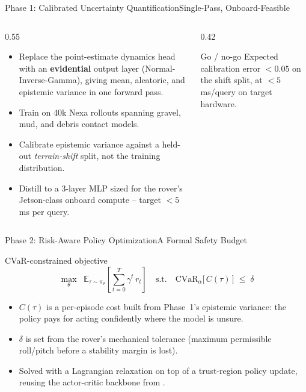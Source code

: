 \begin{frame}{Phase 1: Calibrated Uncertainty Quantification}{Single-Pass, Onboard-Feasible}
  \begin{columns}[T]
    \begin{column}{0.55\textwidth}
      \begin{itemize}
        \item Replace the point-estimate dynamics head with an
          \textbf{evidential} output layer (Normal-Inverse-Gamma), giving
          mean, aleatoric, and epistemic variance in one forward pass.
        \item Train on 40k Nexa rollouts spanning gravel, mud, and debris
          contact models.
        \item Calibrate epistemic variance against a held-out
          \emph{terrain-shift} split, not the training distribution.
        \item Distill to a 3-layer MLP sized for the rover's Jetson-class
          onboard compute -- target $<5$\,ms per query.
      \end{itemize}
    \end{column}
    \begin{column}{0.42\textwidth}
      \begin{copperbox}{Go / no-go}
        \footnotesize
        Expected calibration error $<0.05$ on the shift split, at
        $<5$\,ms/query on target hardware.
      \end{copperbox}
    \end{column}
  \end{columns}
\end{frame}

\begin{frame}{Phase 2: Risk-Aware Policy Optimization}{A Formal Safety Budget}
  \begin{block}{CVaR-constrained objective}
    \[
      \max_{\theta} \;\; \mathbb{E}_{\tau \sim \pi_\theta}
        \left[ \sum_{t=0}^{T} \gamma^t \, r_t \right]
      \quad \text{s.t.} \quad
      \mathrm{CVaR}_{\alpha}\big[\, C(\tau) \,\big] \;\le\; \delta
    \]
  \end{block}
  \begin{itemize}
    \item $C(\tau)$ is a per-episode cost built from Phase~1's epistemic
      variance: the policy pays for acting confidently where the model is
      unsure.
    \item $\delta$ is set from the rover's mechanical tolerance (maximum
      permissible roll/pitch before a stability margin is lost).
    \item Solved with a Lagrangian relaxation on top of a trust-region
      policy update, reusing the actor-critic backbone from
      \cite{chen2025uncertainty}.
  \end{itemize}
\end{frame}

